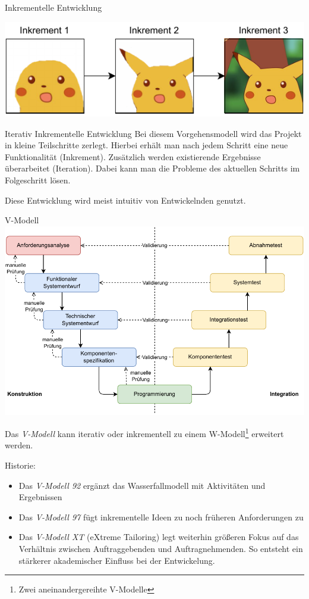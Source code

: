 \begin{example}{Inkrementelle Entwicklung}
    \begin{center}
        \includegraphics{includes/figures/01_incremental_development_example.pdf}
    \end{center}
\end{example}

\begin{defi}{Iterativ Inkrementelle Entwicklung}
    Bei diesem Vorgehensmodell wird das Projekt in kleine Teilschritte zerlegt.
    Hierbei erhält man nach jedem Schritt eine neue Funktionalität (Inkrement).
    Zusätzlich werden existierende Ergebnisse überarbeitet (Iteration).
    Dabei kann man die Probleme des aktuellen Schritts im Folgeschritt lösen.

    Diese Entwicklung wird meist intuitiv von Entwickelnden genutzt.
\end{defi}

\begin{defi}{V-Modell}
    \includegraphics[width=\textwidth]{includes/figures/01_v_model.pdf}

    Das \emph{V-Modell} kann iterativ oder inkrementell zu einem W-Modell\footnote{Zwei aneinandergereihte V-Modelle} erweitert werden.

    Historie:
    \begin{itemize}
        \item Das \emph{V-Modell 92} ergänzt das Wasserfallmodell mit Aktivitäten und Ergebnissen
        \item Das \emph{V-Modell 97} fügt inkrementelle Ideen zu noch früheren Anforderungen zu
        \item Das \emph{V-Modell XT} (eXtreme Tailoring) legt weiterhin größeren Fokus auf das Verhältnis zwischen Auftraggebenden und Auftragnehmenden.
              So entsteht ein stärkerer akademischer Einfluss bei der Entwickelung.
    \end{itemize}
\end{defi}

